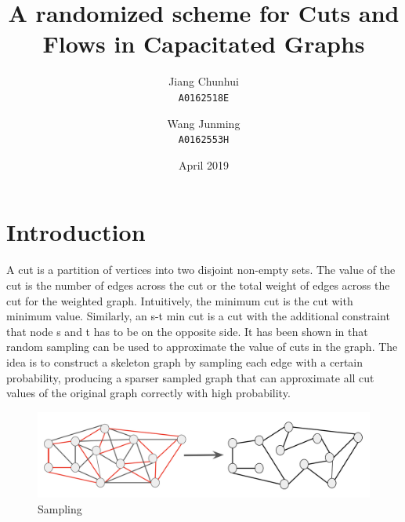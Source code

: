 \documentclass{article}
\title{A randomized scheme for Cuts and Flows in Capacitated Graphs}
\author{    Jiang Chunhui \\ \texttt{A0162518E} \and
            Wang Junming \\ \texttt{A0162553H} }
\date{April 2019}
\begin{document}
\maketitle

\section{Introduction}
A cut is a partition of vertices into two disjoint non-empty sets. The value of the cut is the number of edges across the cut or the total weight of edges across the cut for the weighted graph. Intuitively, the minimum cut is the cut with minimum value. Similarly, an s-t min cut is a cut with the additional constraint that node s and t has to be on the opposite side. It has been shown in \citep{karger1999random} that random sampling can be used to approximate the value of cuts in the graph. The idea is to construct a skeleton graph by sampling each edge with a certain probability, producing a sparser sampled graph that can approximate all cut values of the original graph correctly with high probability.

\begin{figure}[h!]
\centering
\includegraphics[scale=0.4]{images/sample.png}
\caption{Sampling}
\label{fig:sampling}
\end{figure}
\end{document}
